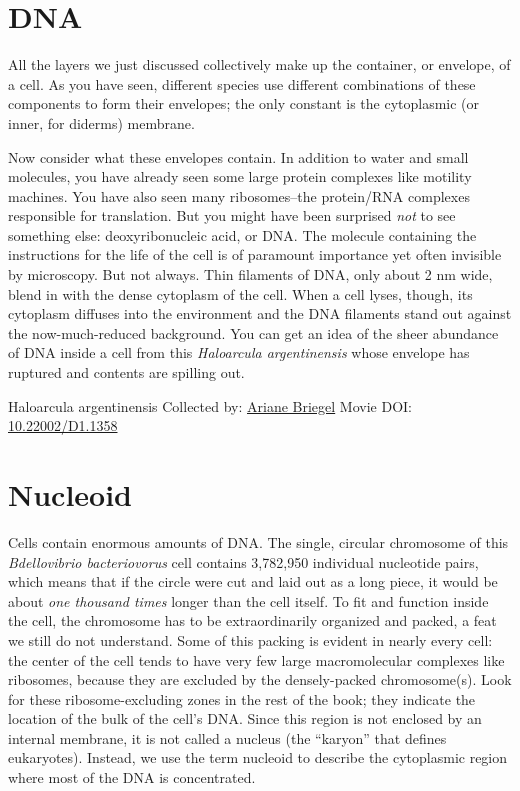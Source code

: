 \documentclass[]{tufte-book}
\begin{document}
\hypertarget{dna}{%
\section{DNA}\label{dna}}

All the layers we just discussed collectively make up the container, or envelope, of a cell. As you have seen, different species use different combinations of these components to form their envelopes; the only constant is the cytoplasmic (or inner, for diderms) membrane.

Now consider what these envelopes contain. In addition to water and small molecules, you have already seen some large protein complexes like motility machines. You have also seen many ribosomes--the protein/RNA complexes responsible for translation. But you might have been surprised \emph{not} to see something else: deoxyribonucleic acid, or DNA. The molecule containing the instructions for the life of the cell is of paramount importance yet often invisible by microscopy. But not always. Thin filaments of DNA, only about 2 nm wide, blend in with the dense cytoplasm of the cell. When a cell lyses, though, its cytoplasm diffuses into the environment and the DNA filaments stand out against the now-much-reduced background. You can get an idea of the sheer abundance of DNA inside a cell from this \emph{Haloarcula argentinensis} whose envelope has ruptured and contents are spilling out.


\hypertarget{htmlwidget-a42be61909f81a8cdded}{}

\label{fig:2-9}Haloarcula argentinensis Collected by: \protect\hyperlink{ariane_briegel}{Ariane Briegel} Movie DOI: \href{https://doi.org/10.22002/D1.1358}{10.22002/D1.1358}

\hypertarget{nucleoid}{%
\section{Nucleoid}\label{nucleoid}}

Cells contain enormous amounts of DNA. The single, circular chromosome of this \emph{Bdellovibrio bacteriovorus} cell contains 3,782,950 individual nucleotide pairs, which means that if the circle were cut and laid out as a long piece, it would be about \emph{one thousand times} longer than the cell itself. To fit and function inside the cell, the chromosome has to be extraordinarily organized and packed, a feat we still do not understand. Some of this packing is evident in nearly every cell: the center of the cell tends to have very few large macromolecular complexes like ribosomes, because they are excluded by the densely-packed chromosome(s). Look for these ribosome-excluding zones in the rest of the book; they indicate the location of the bulk of the cell's DNA. Since this region is not enclosed by an internal membrane, it is not called a nucleus (the ``karyon'' that defines eukaryotes). Instead, we use the term nucleoid to describe the cytoplasmic region where most of the DNA is concentrated.
\end{document}

